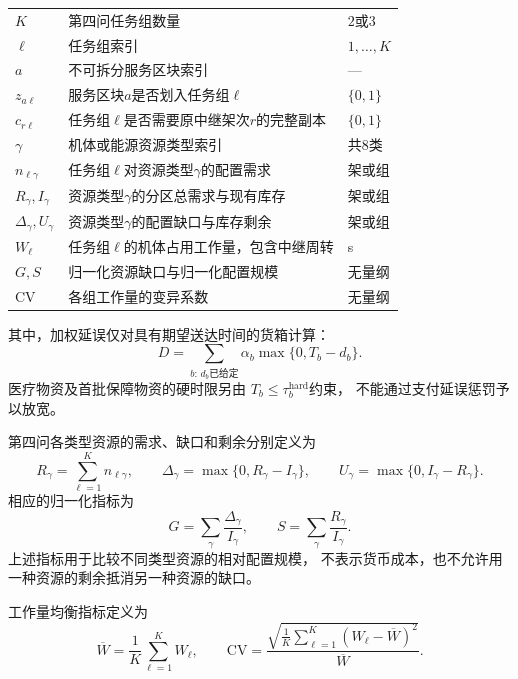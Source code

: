 \documentclass[bwprint]{gmcmthesis}
\begin{document}
\begin{longtable}{
    >{\raggedright\arraybackslash}p{2.8cm}
    >{\raggedright\arraybackslash}p{8.4cm}
    >{\raggedright\arraybackslash}p{2cm}
}
    $K$ & 第四问任务组数量 & $2$或$3$ \\
    $\ell$ & 任务组索引 & $1,\ldots,K$ \\
    $a$ & 不可拆分服务区块索引 & --- \\
    $z_{a\ell}$ &
    服务区块$a$是否划入任务组$\ell$ & $\{0,1\}$ \\
    $c_{r\ell}$ &
    任务组$\ell$是否需要原中继架次$r$的完整副本 & $\{0,1\}$ \\
    $\gamma$ & 机体或能源资源类型索引 & 共8类 \\
    $n_{\ell\gamma}$ &
    任务组$\ell$对资源类型$\gamma$的配置需求 & 架或组 \\
    $R_\gamma,I_\gamma$ &
    资源类型$\gamma$的分区总需求与现有库存 & 架或组 \\
    $\Delta_\gamma,U_\gamma$ &
    资源类型$\gamma$的配置缺口与库存剩余 & 架或组 \\
    $W_\ell$ &
    任务组$\ell$的机体占用工作量，包含中继周转 & s \\
    $G,S$ & 归一化资源缺口与归一化配置规模 & 无量纲 \\
    $\mathrm{CV}$ & 各组工作量的变异系数 & 无量纲 \\

\end{longtable}

其中，加权延误仅对具有期望送达时间的货箱计算：
\begin{equation}
    D
    =
    \sum_{b:\,d_b\text{已给定}}
    \alpha_b\max\{0,T_b-d_b\}.
\end{equation}
医疗物资及首批保障物资的硬时限另由
$T_b\leq \tau_b^{\mathrm{hard}}$约束，
不能通过支付延误惩罚予以放宽。

第四问各类型资源的需求、缺口和剩余分别定义为
\begin{equation}
    R_\gamma
    =
    \sum_{\ell=1}^{K}n_{\ell\gamma},
    \qquad
    \Delta_\gamma
    =
    \max\{0,R_\gamma-I_\gamma\},
    \qquad
    U_\gamma
    =
    \max\{0,I_\gamma-R_\gamma\}.
\end{equation}
相应的归一化指标为
\begin{equation}
    G
    =
    \sum_{\gamma}\frac{\Delta_\gamma}{I_\gamma},
    \qquad
    S
    =
    \sum_{\gamma}\frac{R_\gamma}{I_\gamma}.
\end{equation}
上述指标用于比较不同类型资源的相对配置规模，
不表示货币成本，也不允许用一种资源的剩余抵消另一种资源的缺口。

工作量均衡指标定义为
\begin{equation}
    \overline{W}
    =
    \frac{1}{K}\sum_{\ell=1}^{K}W_\ell,
    \qquad
    \mathrm{CV}
    =
    \frac{
        \sqrt{\frac{1}{K}\sum_{\ell=1}^{K}
        (W_\ell-\overline{W})^2}
    }{\overline{W}}.
\end{equation}
\end{document}

